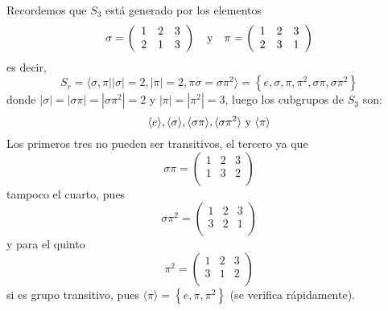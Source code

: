 \documentclass[12pt]{report}
\theoremstyle{largebreak}
\newcommand\abs[1]{\ensuremath{\left|#1\right|}}
\begin{document}
    \begin{obs}
        Recordemos que $S_3$ está generado por los elementos
        \begin{equation*}
            \sigma=\left(
                \begin{array}{ccc}
                    1 & 2 & 3 \\
                    2 & 1 & 3 \\
                \end{array}
            \right)\quad\textup{y}\quad\pi=\left(
                \begin{array}{ccc}
                    1 & 2 & 3 \\
                    2 & 3 & 1 \\
                \end{array}
            \right)
        \end{equation*}
        es decir,
        \begin{equation*}
            S_r=\langle\sigma,\pi\Big|\abs{\sigma}=2,\abs{\pi}=2,\pi\sigma=\sigma\pi^2 \rangle=\left\{e,\sigma,\pi,\pi^2,\sigma\pi,\sigma\pi^2 \right\}
        \end{equation*}
        donde $\abs{\sigma}=\abs{\sigma\pi}=\abs{\sigma\pi^2}=2$ y $\abs{\pi}=\abs{\pi^2}=3$, luego los cubgrupos de $S_3$ son:
        \begin{equation*}
            \langle e\rangle, \langle\sigma\rangle, \langle\sigma\pi\rangle,\langle\sigma\pi^2\rangle\textup{ y } \langle\pi\rangle
        \end{equation*}
        Los primeros tres no pueden ser transitivos, el tercero ya que
        \begin{equation*}
            \sigma\pi=\left(
                \begin{array}{ccc}
                    1 & 2 & 3 \\
                    1 & 3 & 2 \\
                \end{array}
            \right)
        \end{equation*}
        tampoco el cuarto, pues
        \begin{equation*}
            \sigma\pi^2=\left(
                \begin{array}{ccc}
                    1 & 2 & 3 \\
                    3 & 2 & 1 \\
                \end{array}
            \right)
        \end{equation*}
        y para el quinto
        \begin{equation*}
            \pi^2=\left(
                \begin{array}{ccc}
                    1 & 2 & 3 \\
                    3 & 1 & 2 \\
                \end{array}
            \right)
        \end{equation*}
        si es grupo transitivo, pues $\langle\pi\rangle=\left\{e,\pi,\pi^2\right\}$ (se verifica rápidamente).


\end{obs}
\end{document}
